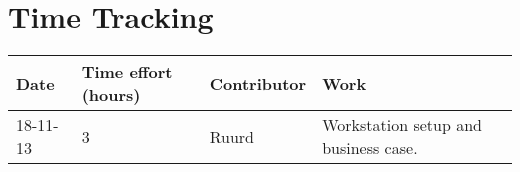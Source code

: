 
\appendix
	\renewcommand{\thepage}{\thechapter-\arabic{page}}



\chapter{Time Tracking}

\begin{center}
    \begin{tabular}{| l | l | l | l |}
    \hline
    
    Date & Time effort (hours) & Contributor & Work\\ \hline
    18-11-13 & 3  & Ruurd & Workstation setup and business case.\\ \hline
    
    \hline
    \end{tabular}
\end{center}







\clearpage
